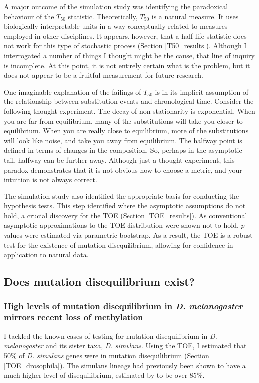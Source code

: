 A major outcome of the simulation study was identifying the paradoxical behaviour of the $T_{50}$ statistic. Theoretically, $T_{50}$ is a natural measure. It uses biologically interpretable units in a way conceptually related to measures employed in other disciplines. It appears, however, that a half-life statistic does not work for this type of stochastic process (Section \ref{T50_results}). Although I interrogated a number of things I thought might be the cause, that line of inquiry is incomplete. At this point, it is not entirely certain what is the problem, but it does not appear to be a fruitful measurement for future research. 

One imaginable explanation of the failings of $T_{50}$ is in its implicit assumption of the relationship between substitution events and chronological time. Consider the following thought experiment. The decay of non-stationarity is exponential. When you are far from equilibrium, many of the substitutions will take you closer to equilibrium. When you are really close to equilibrium, more of the substitutions will look like noise, and take you away from equilibrium. The halfway point is defined in terms of changes in the composition. So, perhaps in the asymptotic tail, halfway can be further away. Although just a thought experiment, this paradox demonstrates that it is not obvious how to choose a metric, and your intuition is not always correct. 

The simulation study also identified the appropriate basis for conducting the hypothesis tests. This step identified where the asymptotic assumptions do not hold, a crucial discovery for the TOE (Section \ref{TOE_results}). As conventional asymptotic approximations to the TOE distribution were shown not to hold, $p$-values were estimated via parametric bootstrap. As a result, the TOE is a robust test for the existence of mutation disequilibrium, allowing for confidence in application to natural data. 

\subsection{Does mutation disequilibrium exist?}

\subsubsection{High levels of mutation disequilibrium in \textit{D. melanogaster} mirrors recent loss of methylation}
I tackled the known cases of testing for mutation disequilibrium in \textit{D. melanogaster} and its sister taxa, \textit{D. simulans}. Using the TOE, I estimated that 50\% of \textit{D. simulans} genes were in mutation disequilibrium (Section \ref{TOE_drosophila}). The simulans lineage had previously been shown to have a much higher level of disequilibrium, estimated by \cite{Squartini2008QuantifyingProcess} to be over 85\%. 

